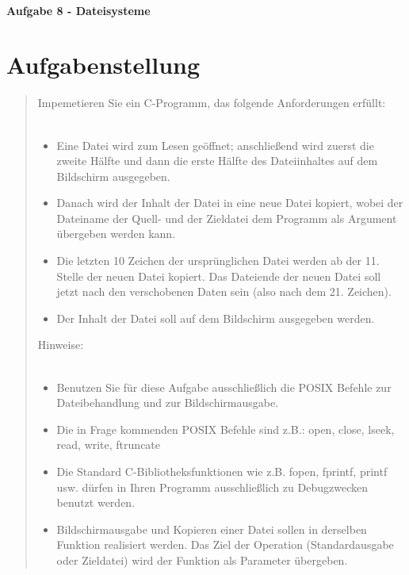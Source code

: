 \newpage

\paragraph{\LARGE Aufgabe 8 - Dateisysteme}

\section{Aufgabenstellung}
	\begin{quote}
		Impemetieren Sie ein C-Programm, das folgende Anforderungen erf\"ullt:\\ \\
		\begin{itemize}
			\item Eine Datei wird zum Lesen ge\"offnet; anschließend wird zuerst die zweite H\"alfte und dann die erste H\"alfte des Dateiinhaltes auf dem Bildschirm ausgegeben.\\
			\item Danach wird der Inhalt der Datei in eine neue Datei kopiert, wobei der Dateiname der Quell- und der Zieldatei dem Programm als Argument \"ubergeben werden kann.\\
			\item Die letzten 10 Zeichen der urspr\"unglichen Datei werden ab der 11. Stelle der neuen Datei kopiert. Das Dateiende der neuen Datei soll jetzt nach den verschobenen Daten sein (also nach dem 21. Zeichen).\\
			\item Der Inhalt der Datei soll auf dem Bildschirm ausgegeben werden.\\
		\end{itemize}
		Hinweise:\\ \\
		\begin{itemize}
			\item Benutzen Sie f\"ur diese Aufgabe ausschließlich die POSIX Befehle zur Dateibehandlung und zur Bildschirmausgabe.\\
			\item Die in Frage kommenden POSIX Befehle sind z.B.: open, close, lseek, read, write, ftruncate\\
			\item Die Standard C-Bibliotheksfunktionen wie z.B. fopen, fprintf, printf usw. d\"urfen in Ihren Programm ausschließlich zu Debugzwecken benutzt werden.\\
			\item Bildschirmausgabe und Kopieren einer Datei sollen in derselben Funktion realisiert werden. Das Ziel der Operation (Standardausgabe oder Zieldatei) wird der Funktion als Parameter \"ubergeben.\\

\end{itemize}
\end{quote}
